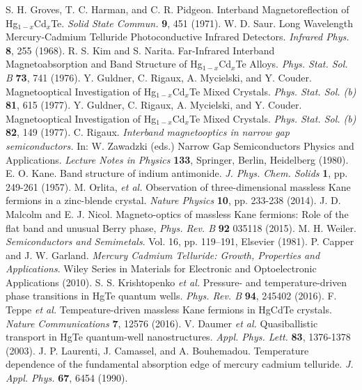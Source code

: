 \documentclass[titlepage,a4paper]{book}
\begin{document}
\begin{thebibliography}{199}
S. H. Groves, T. C. Harman, and C. R. Pidgeon. Interband Magnetoreflection of Hg$_{1-x}$Cd$_x$Te. \textit{Solid State Commun.} \textbf{9}, 451 (1971).
W. D. Saur. Long Wavelength Mercury-Cadmium Telluride Photoconductive Infrared Detectors. \textit{Infrared Phys.} \textbf{8}, 255 (1968).
R. S. Kim and S. Narita. Far-Infrared Interband Magnetoabsorption and Band Structure of Hg$_{1-x}$Cd$_x$Te Alloys. \textit{Phys. Stat. Sol. B} \textbf{73}, 741 (1976).
Y. Guldner, C. Rigaux, A. Mycielski, and Y. Couder. Magnetooptical Investigation of Hg$_{1-x}$Cd$_x$Te Mixed Crystals. \textit{Phys. Stat. Sol. (b)} \textbf{81}, 615 (1977).
Y. Guldner, C. Rigaux, A. Mycielski, and Y. Couder. Magnetooptical Investigation of Hg$_{1-x}$Cd$_x$Te Mixed Crystals. \textit{Phys. Stat. Sol. (b)} \textbf{82}, 149 (1977).
C. Rigaux. \textit{Interband magnetooptics in narrow gap semiconductors.} In: W. Zawadzki (eds.) Narrow Gap Semiconductors Physics and Applications. \textit{Lecture Notes in Physics} \textbf{133}, Springer, Berlin, Heidelberg (1980).
E. O. Kane. Band structure of indium antimonide. \textit{J. Phys. Chem. Solids} \textbf{1}, pp. 249-261 (1957).
M. Orlita, \textit{et al.} Observation of three-dimensional massless Kane fermions in a zinc-blende crystal. \textit{Nature Physics} \textbf{10}, pp. 233-238 (2014).
J. D. Malcolm and E. J. Nicol. Magneto-optics of massless Kane fermions: Role of the flat band and unusual Berry phase, \textit{Phys. Rev. B} \textbf{92} 035118 (2015).
M. H. Weiler. \textit{Semiconductors and Semimetals}. Vol. 16, pp. 119–191, Elsevier (1981).
P. Capper and J. W. Garland. \textit{Mercury Cadmium Telluride: Growth, Properties and Applications}. Wiley Series in Materials for Electronic and Optoelectronic Applications (2010).
S. S. Krishtopenko \textit{et al.} Pressure- and temperature-driven phase transitions in HgTe quantum wells. \textit{Phys. Rev. B} \textbf{94}, 245402 (2016).
F. Teppe \textit{et al.} Tempeature-driven massless Kane fermions in HgCdTe crystals. \textit{Nature Communications} \textbf{7}, 12576 (2016).
V. Daumer \textit{et al.} Quasiballistic transport in HgTe quantum-well nanostructures. \textit{Appl. Phys. Lett.} \textbf{83}, 1376-1378 (2003).
J. P. Laurenti, J. Camassel, and A. Bouhemadou. Temperature dependence of the fundamental absorption edge of mercury cadmium telluride. \textit{J. Appl. Phys.} \textbf{67}, 6454 (1990).

\end{thebibliography}
\end{document}
